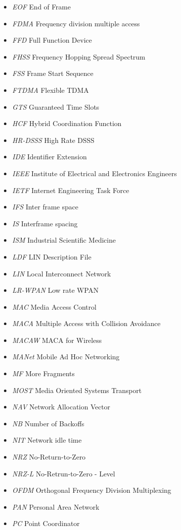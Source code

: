 \documentclass{article}
\begin{document}
\begin{itemize}
	\item \emph{EOF} End of Frame
	\item \emph{FDMA} Frequency division multiple access
	\item \emph{FFD} Full Function Device
	\item \emph{FHSS} Frequency Hopping Spread Spectrum
	\item \emph{FSS} Frame Start Sequence
	\item \emph{FTDMA} Flexible TDMA
	\item \emph{GTS} Guaranteed Time Slots
	\item \emph{HCF} Hybrid Coordination Function
	\item \emph{HR-DSSS} High Rate DSSS
	\item \emph{IDE} Identifier Extension
	\item \emph{IEEE} Institute of Electrical and Electronics Engineers 
	\item \emph{IETF} Internet Engineering Task Force
	\item \emph{IFS} Inter frame space
	\item \emph{IS} Interframe spacing
	\item \emph{ISM} Industrial Scientific Medicine
	\item \emph{LDF} LIN Description File
	\item \emph{LIN} Local Interconnect Network
	\item \emph{LR-WPAN} Low rate WPAN
	\item \emph{MAC} Media Access Control
	\item \emph{MACA} Multiple Access with Collision Avoidance
	\item \emph{MACAW} MACA for Wireless
	\item \emph{MANet} Mobile Ad Hoc Networking
	\item \emph{MF} More Fragments
	\item \emph{MOST} Media Oriented Systems Transport
	\item \emph{NAV} Network Allocation Vector
	\item \emph{NB} Number of Backoffs
	\item \emph{NIT} Network idle time
	\item \emph{NRZ} No-Return-to-Zero
	\item \emph{NRZ-L} No-Retrun-to-Zero - Level
	\item \emph{OFDM} Orthogonal Frequency Division Multiplexing
	\item \emph{PAN} Personal Area Network
	\item \emph{PC} Point Coordinator

\end{itemize}
\end{document}
